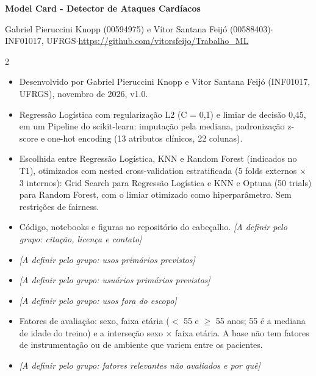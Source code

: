 \documentclass[10pt,a4paper]{article}
\newcommand{\secao}[1]{\par\vspace{5pt}{\normalsize\bfseries #1}\par\vspace{1pt}}
\newcommand{\pendente}[1]{{\color{pendente}\itshape[A definir pelo grupo: #1]}}
\begin{document}
\small

\begin{center}
{\Large\bfseries Model Card - Detector de Ataques Cardíacos}\par\vspace{2pt}
{\footnotesize Gabriel Pieruccini Knopp (00594975) e Vítor Santana Feijó (00588403)\enspace$\cdot$\enspace
INF01017, UFRGS\enspace$\cdot$\enspace \url{https://github.com/vitorsfeijo/Trabalho_ML}}
\end{center}
\vspace{-4pt}

\begin{paracol}{2}

\secao{Model Details}
\begin{itemize}
\item Desenvolvido por Gabriel Pieruccini Knopp e Vítor Santana Feijó (INF01017, UFRGS), novembro de 2026, v1.0.
\item Regressão Logística com regularização L2 (C = 0,1) e limiar de decisão 0,45, em um Pipeline do scikit-learn: imputação pela mediana, padronização z-score e one-hot encoding (13 atributos clínicos, 22 colunas).
\item Escolhida entre Regressão Logística, KNN e Random Forest (indicados no T1), otimizados com nested cross-validation estratificada (5 folds externos $\times$ 3 internos): Grid Search para Regressão Logística e KNN e Optuna (50 trials) para Random Forest, com o limiar otimizado como hiperparâmetro. Sem restrições de fairness.
\item Código, notebooks e figuras no repositório do cabeçalho. \pendente{citação, licença e contato}
\end{itemize}

\secao{Intended Use}
\begin{itemize}
\item \pendente{usos primários previstos}
\item \pendente{usuários primários previstos}
\item \pendente{usos fora do escopo}
\end{itemize}

\secao{Factors}
\begin{itemize}
\item Fatores de avaliação: sexo, faixa etária ($<$ 55 e $\geq$ 55 anos; 55 é a mediana de idade do treino) e a interseção sexo $\times$ faixa etária. A base não tem fatores de instrumentação ou de ambiente que variem entre os pacientes.
\item \pendente{fatores relevantes não avaliados e por quê}
\end{itemize}


\end{paracol}
\end{document}
